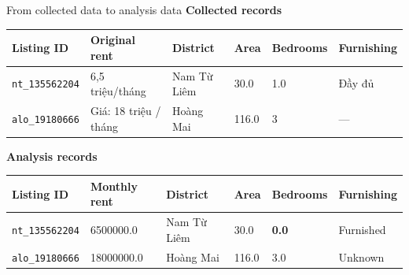 \documentclass[10pt,t,aspectratio=169]{beamer}
\begin{document}
\begin{frame}{From collected data to analysis data}
\vspace{0.22cm}
{\bfseries\color{hustprimary}Collected records}\par
\small
\renewcommand{\arraystretch}{1.15}
\begin{tabularx}{\textwidth}{@{}L{2.25cm}L{3.15cm}L{2cm}L{1cm}L{1.55cm}Y@{}}
\toprule
\textbf{Listing ID} & \textbf{Original rent} & \textbf{District} & \textbf{Area} & \textbf{Bedrooms} & \textbf{Furnishing} \\\midrule
\texttt{nt\_135562204} & 6,5 triệu/tháng & Nam Từ Liêm & 30.0 & 1.0 & Đầy đủ \\
\texttt{alo\_19180666} & Giá: 18 triệu / tháng & Hoàng Mai & 116.0 & 3 & --- \\
\bottomrule
\end{tabularx}
\par\vspace{0.25cm}
{\bfseries\color{hustprimary}Analysis records}\par
\begin{tabularx}{\textwidth}{@{}L{2.25cm}L{3.15cm}L{2cm}L{1cm}L{1.55cm}Y@{}}
\toprule
\textbf{Listing ID} & \textbf{Monthly rent} & \textbf{District} & \textbf{Area} & \textbf{Bedrooms} & \textbf{Furnishing} \\\midrule
\texttt{nt\_135562204} & 6500000.0 & Nam Từ Liêm & 30.0 & \textbf{0.0} & Furnished \\
\texttt{alo\_19180666} & 18000000.0 & Hoàng Mai & 116.0 & 3.0 & Unknown \\
\bottomrule
\end{tabularx}
\vfill
\end{frame}
\end{document}
